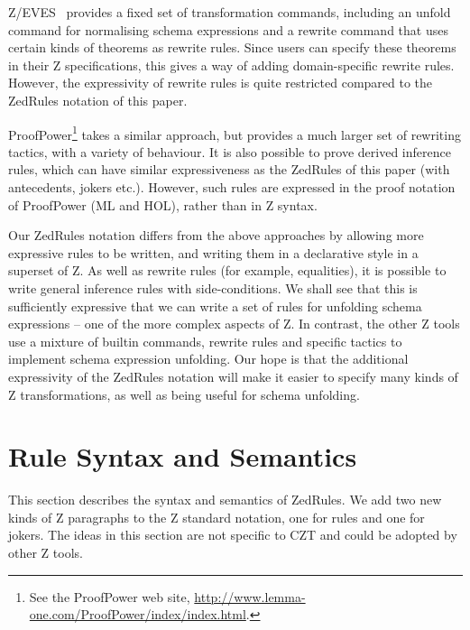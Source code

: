 \documentclass{entcs}
\begin{document}
Z/EVES~\cite{zeves:98} provides a fixed set of transformation
commands, including an unfold command for normalising schema
expressions and a rewrite command that uses certain kinds of theorems
as rewrite rules.  Since users can specify these theorems in their Z
specifications, this gives a way of adding domain-specific rewrite
rules.  However, the expressivity of rewrite rules is quite restricted
compared to the ZedRules notation of this paper.

ProofPower\footnote{See the ProofPower web site,
\url{http://www.lemma-one.com/ProofPower/index/index.html}.} takes a
similar approach, but provides a much larger set of rewriting tactics,
with a variety of behaviour.  It is also possible to prove derived
inference rules, which can have similar expressiveness as the ZedRules
of this paper (with antecedents, jokers etc.).  However, such rules
are expressed in the proof notation of ProofPower (ML and HOL), rather
than in Z syntax.

Our ZedRules notation differs from the above approaches by allowing more
expressive rules to be written, and writing them in a declarative style in
a superset of Z.  As well as rewrite rules (for example, equalities), it is
possible to write general inference rules with side-conditions.  We shall
see that this is sufficiently expressive that we can write a set of rules
for unfolding schema expressions -- one of the more complex aspects of Z.
In contrast, the other Z tools use a mixture of builtin commands, rewrite
rules and specific tactics to implement schema expression unfolding.  Our
hope is that the additional expressivity of the ZedRules notation will make
it easier to specify many kinds of Z transformations, as well as being
useful for schema unfolding.




\section{Rule Syntax and Semantics} \label{sec:syntax}

This section describes the syntax and semantics of ZedRules.  We add
two new kinds of Z paragraphs to the Z standard notation, one for
rules and one for jokers.  The ideas in this section are not specific
to CZT and could be adopted by other Z tools.
\end{document}
